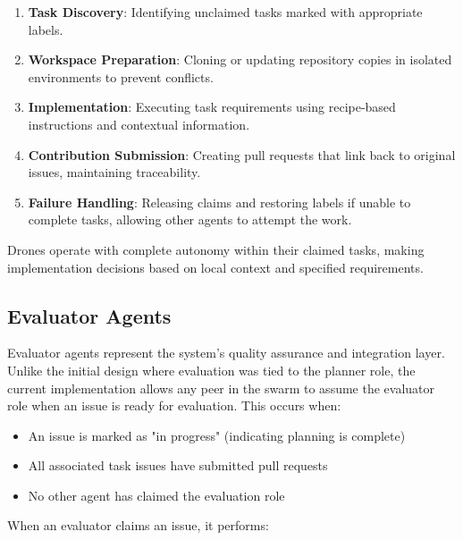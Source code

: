 \documentclass[11pt,a4paper]{article}
\begin{document}
\begin{enumerate}
    \item \textbf{Task Discovery}: Identifying unclaimed tasks marked with appropriate labels.
    
    \item \textbf{Workspace Preparation}: Cloning or updating repository copies in isolated environments to prevent conflicts.
    
    \item \textbf{Implementation}: Executing task requirements using recipe-based instructions and contextual information.
    
    \item \textbf{Contribution Submission}: Creating pull requests that link back to original issues, maintaining traceability.
    
    \item \textbf{Failure Handling}: Releasing claims and restoring labels if unable to complete tasks, allowing other agents to attempt the work.
\end{enumerate}

Drones operate with complete autonomy within their claimed tasks, making implementation decisions based on local context and specified requirements.

\subsection{Evaluator Agents}

Evaluator agents represent the system's quality assurance and integration layer. Unlike the initial design where evaluation was tied to the planner role, the current implementation allows any peer in the swarm to assume the evaluator role when an issue is ready for evaluation. This occurs when:

\begin{itemize}
    \item An issue is marked as "in progress" (indicating planning is complete)
    \item All associated task issues have submitted pull requests
    \item No other agent has claimed the evaluation role
\end{itemize}

When an evaluator claims an issue, it performs:
\end{document}
